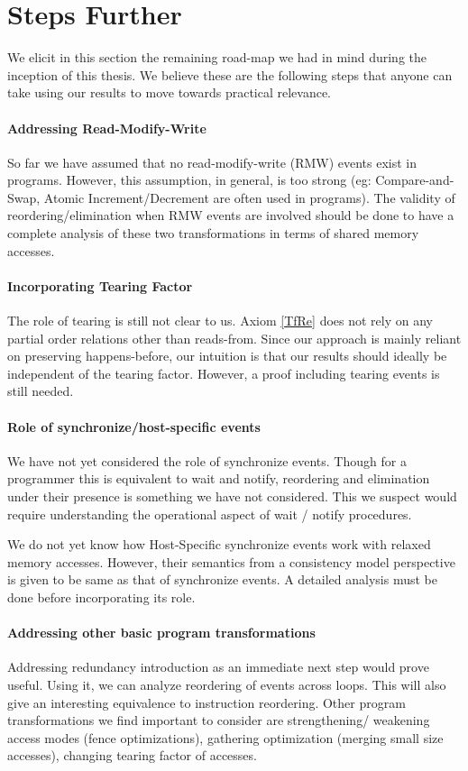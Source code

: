\section{Steps Further}

    We elicit in this section the remaining road-map we had in mind during the inception of this thesis. 
    We believe these are the following steps that anyone can take using our results to move towards practical relevance.

    \paragraph{Addressing Read-Modify-Write}
        So far we have assumed that no read-modify-write (RMW) events exist in programs.
        However, this assumption, in general, is too strong (eg: Compare-and-Swap, Atomic Increment/Decrement are often used in programs).
        The validity of reordering/elimination when RMW events are involved should be done to have a complete analysis of these two transformations in terms of shared memory accesses.

    \paragraph{Incorporating Tearing Factor}
        The role of tearing is still not clear to us.
        Axiom \ref{TfRe} does not rely on any partial order relations other than reads-from. 
        Since our approach is mainly reliant on preserving happens-before, our intuition is that our results should ideally be independent of the tearing factor.
        However, a proof including tearing events is still needed.   
  
    \paragraph{Role of synchronize/host-specific events}
        We have not yet considered the role of synchronize events. 
        Though for a programmer this is equivalent to wait and notify, reordering and elimination under their presence is something we have not considered. 
        This we suspect would require understanding the operational aspect of wait / notify procedures.

        We do not yet know how Host-Specific synchronize events work with relaxed memory accesses.
        However, their semantics from a consistency model perspective is given to be same as that of synchronize events. 
        A detailed analysis must be done before incorporating its role. 
    
    \paragraph{Addressing other basic program transformations}
        Addressing redundancy introduction as an immediate next step would prove useful.
        Using it, we can analyze reordering of events across loops. 
        This will also give an interesting equivalence to instruction reordering. 
        Other program transformations we find important to consider are strengthening/ weakening access modes (fence optimizations), gathering optimization (merging small size accesses), changing tearing factor of accesses. 